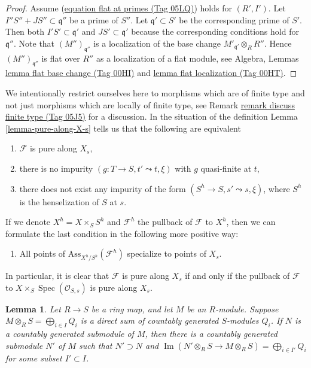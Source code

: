 \documentclass{amsart}
\theoremstyle{plain}
\newtheorem{lemma}[subsection]{Lemma}
\theoremstyle{definition}
\theoremstyle{remark}
\numberwithin{equation}{subsection}
\def\Spec{\mathop{\mathrm{Spec}}}
\def\Im{\mathop{\mathrm{Im}}}
\begin{document}
\begin{proof}
Assume (\href{https://stacks.math.columbia.edu/tag/05LQ}{equation flat at primes (Tag 05LQ)}) holds for $(R', I')$.
Let $I''S'' + JS'' \subset \mathfrak q''$ be a prime of $S''$.
Let $\mathfrak q' \subset S'$ be the corresponding prime of $S'$.
Then both $I'S' \subset \mathfrak q'$ and $JS' \subset \mathfrak q'$
because the corresponding conditions hold for $\mathfrak q''$.
Note that $(M'')_{\mathfrak q''}$
is a localization of the base change $M'_{\mathfrak q'} \otimes_R R''$.
Hence $(M'')_{\mathfrak q''}$ is flat over $R''$ as a localization
of a flat module, see
Algebra, Lemmas \href{https://stacks.math.columbia.edu/tag/00HI}{lemma flat base change (Tag 00HI)} and
\href{https://stacks.math.columbia.edu/tag/00HT}{lemma flat localization (Tag 00HT)}.
\end{proof}



\noindent
We intentionally restrict ourselves here to morphisms which are
of finite type and not just morphisms which are locally of
finite type, see
Remark \href{https://stacks.math.columbia.edu/tag/05J5}{remark discuss finite type (Tag 05J5)}
for a discussion. In the situation of the definition
Lemma \ref{lemma-pure-along-X-s}
tells us that the following are equivalent
\begin{enumerate}
\item $\mathcal{F}$ is pure along $X_s$,
\item there is no impurity $(g : T \to S, t' \leadsto t, \xi)$ with $g$
quasi-finite at $t$,
\item there does not exist any impurity of the form
$(S^h \to S, s' \leadsto s, \xi)$, where $S^h$ is the henselization
of $S$ at $s$.
\end{enumerate}
If we denote $X^h = X \times_S S^h$ and $\mathcal{F}^h$ the pullback
of $\mathcal{F}$ to $X^h$, then we can formulate the last condition
in the following more positive way:
\begin{enumerate}
\item[(4)] All points of $\text{Ass}_{X^h/S^h}(\mathcal{F}^h)$ specialize
to points of $X_s$.
\end{enumerate}
In particular, it is clear that $\mathcal{F}$ is pure along $X_s$
if and only if the pullback of $\mathcal{F}$ to
$X \times_S \Spec(\mathcal{O}_{S, s})$ is pure along $X_s$.



\begin{lemma}
\label{algebra-lemma-adapted-submodule}
Let $R \to S$ be a ring map, and let $M$ be an $R$-module.  Suppose $M
\otimes_R S = \bigoplus_{i \in I} Q_i$ is a direct sum of countably generated
$S$-modules $Q_i$.  If $N$ is a countably generated submodule of $M$, then
there is a countably generated submodule $N'$ of $M$ such that $N' \supset N$
and $\Im(N' \otimes_R S \to M \otimes_R S) =
\bigoplus_{i \in I'} Q_i$ for some subset $I' \subset I$.
\end{lemma}
\end{document}
